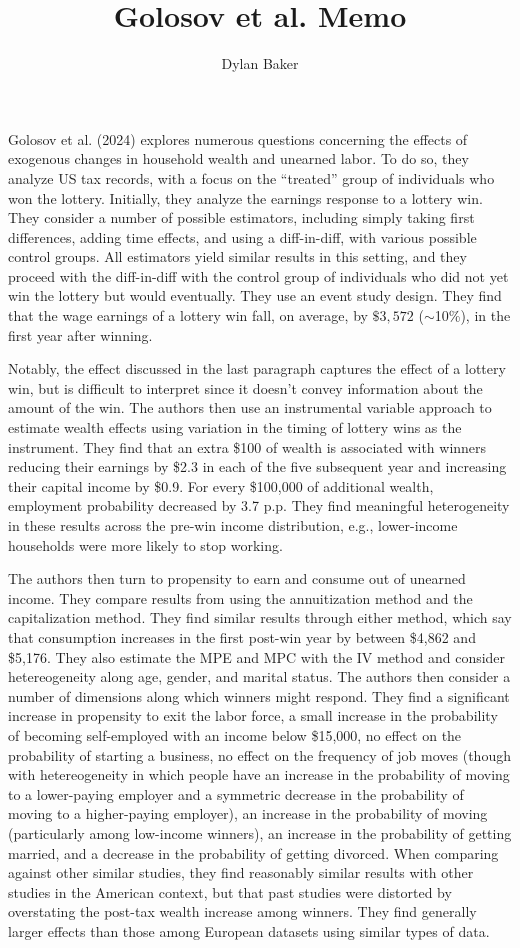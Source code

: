 \documentclass[11pt]{article}
\title{Golosov et al. Memo}
\author{Dylan Baker}
\begin{document}
Golosov et al. (2024) explores 
numerous questions concerning 
the effects of exogenous 
changes in household wealth 
and unearned labor. 
To do so, they analyze US tax records, 
with a focus on the ``treated'' 
group of individuals who 
won the lottery.
Initially, they analyze the 
earnings response to a lottery win.
They consider a number of possible 
estimators, including 
simply taking first differences, adding 
time effects, and using a diff-in-diff,
with various possible control
groups. All estimators yield 
similar results in this setting, 
and they proceed with the diff-in-diff
with the control group 
of individuals who did not yet win the lottery
but would eventually. They use an event 
study design.
They find that the wage earnings of a lottery win 
fall, on average, by 
$\$ 3,572$ ($\sim$10\%), in the first year after winning.

Notably, the effect discussed in the
last paragraph captures
the effect of a lottery win, but is difficult to 
interpret since it doesn't convey information
about the amount of the win.
The authors then use an instrumental variable
approach to estimate wealth effects
using variation in the timing of lottery wins
as the instrument. They find that 
an extra \$100 of wealth is 
associated with winners reducing 
their earnings by \$2.3 
in each of the five subsequent year and
increasing their capital income by \$0.9.
For every \$100,000 of additional wealth,
employment probability decreased by 3.7 p.p.
They find meaningful heterogeneity in these
results across the pre-win income 
distribution, e.g., 
lower-income households were more likely to stop working.

The authors then turn to 
propensity to 
earn and consume out of unearned income. 
They compare results from 
using the annuitization method 
and the capitalization method.
They find similar results through either method,
which say 
that consumption increases 
in the first post-win year 
by between \$4,862 and \$5,176.
They also estimate the MPE and MPC
with the IV method and consider 
hetereogeneity along 
age, gender, and marital status.
The authors then consider a number of 
dimensions along which winners 
might respond. They find 
a significant increase in propensity to 
exit the labor force, 
a small increase in the probability of
becoming self-employed with an income below 
\$15,000, no effect on the probability of starting 
a business, no effect on the frequency 
of job moves (though with hetereogeneity in which 
people have an increase in the probability of 
moving to a lower-paying employer and a symmetric 
decrease in the probability of moving to a higher-paying employer),
an increase in the probability of moving (particularly 
among low-income winners), an increase in the probability of 
getting married, and a decrease in the probability of 
getting divorced.
When comparing against other similar studies,
they find reasonably similar results 
with other studies in the American context,
but that past studies were distorted by overstating 
the post-tax wealth increase among winners. 
They find generally larger effects 
than those among European datasets using similar types 
of data.
\end{document}
